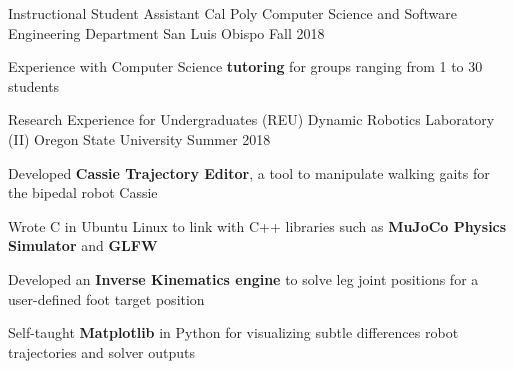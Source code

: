 

\begin{cventries}

  
  \cventry
    {Instructional Student Assistant} %
    {Cal Poly Computer Science and Software Engineering Department} %
    {San Luis Obispo} %
    {Fall 2018} %
    {
      \begin{cvitems} %
        \item {Experience with Computer Science \textbf{tutoring} for groups ranging from 1 to 30 students}      
      \end{cvitems}
    }
  


  \cventry
    {Research Experience for Undergraduates (REU)} %
    {Dynamic Robotics Laboratory (II)} %
    {Oregon State University} %
    {Summer 2018} %
    {
      \begin{cvitems} %
        \item {Developed \textbf{Cassie Trajectory Editor}, a tool to manipulate walking gaits for the bipedal robot Cassie}
        \item {Wrote C in Ubuntu Linux to link with C++ libraries such as \textbf{MuJoCo Physics Simulator} and \textbf{GLFW}}
        \item {Developed an \textbf{Inverse Kinematics engine} to solve leg joint positions for a user-defined foot target position}
        \item {Self-taught \textbf{Matplotlib} in Python for visualizing subtle differences robot trajectories and solver outputs}
      \end{cvitems}
    }
  




\end{cventries}
